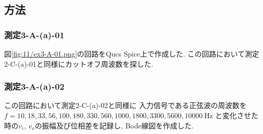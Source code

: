 \subsection{方法}
\subsubsection{測定3-A-(a)-01}
図\ref{fig:11/ex3-A-01.png}の回路をQucs Spice上で作成した.
この回路において測定2-C-(a)-01と同様にカットオフ周波数を探した.
\subsubsection{測定3-A-(a)-02}
この回路において測定2-C-(a)-02と同様に
入力信号である正弦波の周波数を$f=10,18,33,56,100,180,330,560,1000,1800,3300,5600,10000\ \si{\hertz}$
と変化させた時の$v_i$, $v_o$の振幅及び位相差を記録し, Bode線図を作成した.